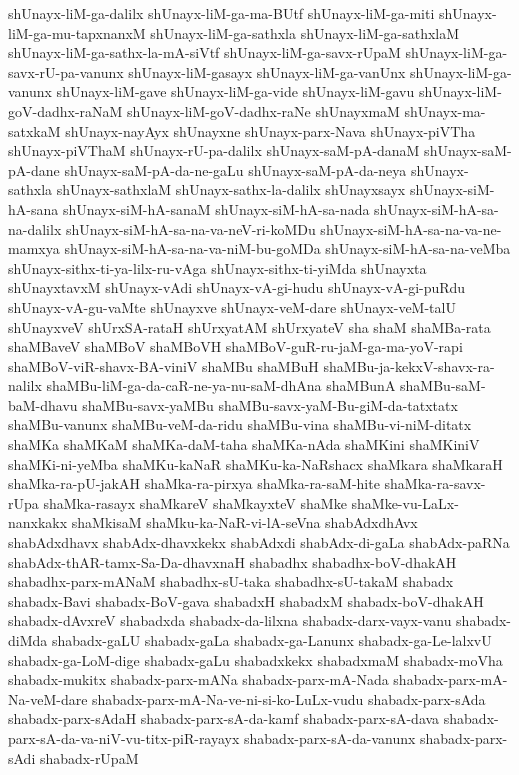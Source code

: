 {shUnayx-liM-ga-dalilx
shUnayx-liM-ga-ma-BUtf
shUnayx-liM-ga-miti
shUnayx-liM-ga-mu-tapxnanxM
shUnayx-liM-ga-sathxla
shUnayx-liM-ga-sathxlaM
shUnayx-liM-ga-sathx-la-mA-siVtf
shUnayx-liM-ga-savx-rUpaM
shUnayx-liM-ga-savx-rU-pa-vanunx
shUnayx-liM-gasayx
shUnayx-liM-ga-vanUnx
shUnayx-liM-ga-vanunx
shUnayx-liM-gave
shUnayx-liM-ga-vide
shUnayx-liM-gavu
shUnayx-liM-goV-dadhx-raNaM
shUnayx-liM-goV-dadhx-raNe
shUnayxmaM
shUnayx-ma-satxkaM
shUnayx-nayAyx
shUnayxne
shUnayx-parx-Nava
shUnayx-piVTha
shUnayx-piVThaM
shUnayx-rU-pa-dalilx
shUnayx-saM-pA-danaM
shUnayx-saM-pA-dane
shUnayx-saM-pA-da-ne-gaLu
shUnayx-saM-pA-da-neya
shUnayx-sathxla
shUnayx-sathxlaM
shUnayx-sathx-la-dalilx
shUnayxsayx
shUnayx-siM-hA-sana
shUnayx-siM-hA-sanaM
shUnayx-siM-hA-sa-nada
shUnayx-siM-hA-sa-na-dalilx
shUnayx-siM-hA-sa-na-va-neV-ri-koMDu
shUnayx-siM-hA-sa-na-va-ne-mamxya
shUnayx-siM-hA-sa-na-va-niM-bu-goMDa
shUnayx-siM-hA-sa-na-veMba
shUnayx-sithx-ti-ya-lilx-ru-vAga
shUnayx-sithx-ti-yiMda
shUnayxta
shUnayxtavxM
shUnayx-vAdi
shUnayx-vA-gi-hudu
shUnayx-vA-gi-puRdu
shUnayx-vA-gu-vaMte
shUnayxve
shUnayx-veM-dare
shUnayx-veM-talU
shUnayxveV
shUrxSA-rataH
shUrxyatAM
shUrxyateV
sha
shaM
shaMBa-rata
shaMBaveV
shaMBoV
shaMBoVH
shaMBoV-guR-ru-jaM-ga-ma-yoV-rapi
shaMBoV-viR-shavx-BA-viniV
shaMBu
shaMBuH
shaMBu-ja-kekxV-shavx-ra-nalilx
shaMBu-liM-ga-da-caR-ne-ya-nu-saM-dhAna
shaMBunA
shaMBu-saM-baM-dhavu
shaMBu-savx-yaMBu
shaMBu-savx-yaM-Bu-giM-da-tatxtatx
shaMBu-vanunx
shaMBu-veM-da-ridu
shaMBu-vina
shaMBu-vi-niM-ditatx
shaMKa
shaMKaM
shaMKa-daM-taha
shaMKa-nAda
shaMKini
shaMKiniV
shaMKi-ni-yeMba
shaMKu-kaNaR
shaMKu-ka-NaRshacx
shaMkara
shaMkaraH
shaMka-ra-pU-jakAH
shaMka-ra-pirxya
shaMka-ra-saM-hite
shaMka-ra-savx-rUpa
shaMka-rasayx
shaMkareV
shaMkayxteV
shaMke
shaMke-vu-LaLx-nanxkakx
shaMkisaM
shaMku-ka-NaR-vi-lA-seVna
shabAdxdhAvx
shabAdxdhavx
shabAdx-dhavxkekx
shabAdxdi
shabAdx-di-gaLa
shabAdx-paRNa
shabAdx-thAR-tamx-Sa-Da-dhavxnaH
shabadhx
shabadhx-boV-dhakAH
shabadhx-parx-mANaM
shabadhx-sU-taka
shabadhx-sU-takaM
shabadx
shabadx-Bavi
shabadx-BoV-gava
shabadxH
shabadxM
shabadx-boV-dhakAH
shabadx-dAvxreV
shabadxda
shabadx-da-lilxna
shabadx-darx-vayx-vanu
shabadx-diMda
shabadx-gaLU
shabadx-gaLa
shabadx-ga-Lanunx
shabadx-ga-Le-lalxvU
shabadx-ga-LoM-dige
shabadx-gaLu
shabadxkekx
shabadxmaM
shabadx-moVha
shabadx-mukitx
shabadx-parx-mANa
shabadx-parx-mA-Nada
shabadx-parx-mA-Na-veM-dare
shabadx-parx-mA-Na-ve-ni-si-ko-LuLx-vudu
shabadx-parx-sAda
shabadx-parx-sAdaH
shabadx-parx-sA-da-kamf
shabadx-parx-sA-dava
shabadx-parx-sA-da-va-niV-vu-titx-piR-rayayx
shabadx-parx-sA-da-vanunx
shabadx-parx-sAdi
shabadx-rUpaM
}
